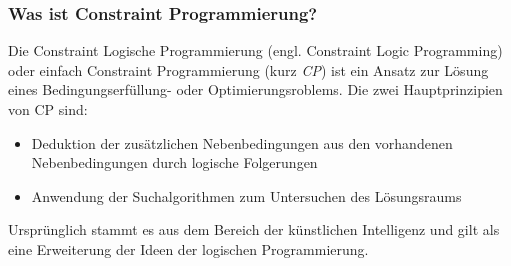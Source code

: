 \documentclass[hyperref={pdfpagelabels=false}]{beamer}
\begin{document}
\nocite{CSP}
\nocite{CPforScheduling}
\begin{frame}

\frametitle{Was ist Constraint Programmierung?}

\begin{block}{}
    Die {\color{darkred} Constraint Logische Programmierung} (engl. Constraint Logic Programming) oder einfach {\color{darkred}Constraint Programmierung} (kurz {\color{darkred} \it CP}) ist ein Ansatz zur Lösung eines Bedingungserfüllung- oder Optimierungsroblems. Die zwei Hauptprinzipien von CP sind:\\
    \begin{itemize}
    \item Deduktion der zusätzlichen Nebenbedingungen aus den vorhandenen Nebenbedingungen durch logische Folgerungen
    \item Anwendung der Suchalgorithmen zum Untersuchen des Lösungsraums
    \end{itemize}
\end{block}

\pause 
{\centering
Ursprünglich stammt es aus dem Bereich der künstlichen Intelligenz und gilt als eine Erweiterung
der Ideen der logischen Programmierung.
}

\end{frame}

\end{document}
